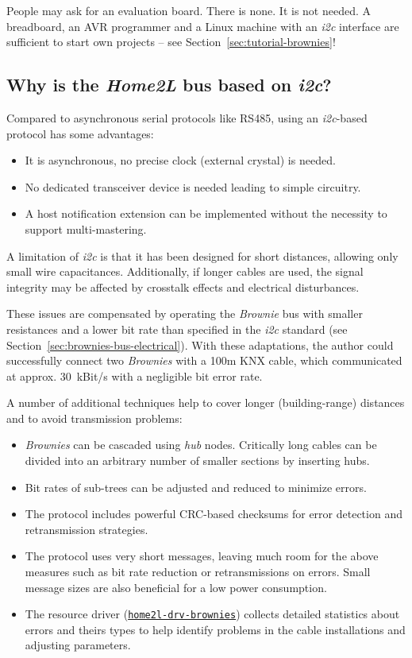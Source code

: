 \documentclass[12pt,english,parskip=half,headheight=19pt]{scrreprt}
\newcommand{\idx}[1]{#1\index{#1}}
\newcommand{\reftool}[1]{\hyperref[tool:#1]{\texttt{\idx{#1}}}}
\begin{document}
People may ask for an evaluation board. There is none. It is not needed. A breadboard, an AVR programmer and a Linux machine with an \textit{i2c} interface are sufficient to start own projects -- see Section~\ref{sec:tutorial-brownies}!



\subsection*{Why is the \textit{Home2L} bus based on \textit{i2c}?}

Compared to asynchronous serial protocols like RS485, using an \textit{i2c}-based protocol has some advantages:
\begin{itemize}
  \item It is asynchronous, no precise clock (external crystal) is needed.
  \item No dedicated transceiver device is needed leading to simple circuitry.
  \item A host notification extension can be implemented without the necessity to support
        multi-mastering.
\end{itemize}

A limitation of \textit{i2c} is that it has been designed for short distances, allowing only small wire capacitances. Additionally, if longer cables are used, the signal integrity may be affected by crosstalk effects and electrical disturbances.

These issues are compensated by operating the \textit{Brownie} bus with smaller resistances and a lower bit rate than specified in the \textit{i2c} standard (see Section~\ref{sec:brownies-bus-electrical}). With these adaptations, the author could successfully connect two \textit{Brownies} with a 100m KNX cable, which communicated at approx. 30~kBit/s with a negligible bit error rate.

A number of additional techniques help to cover longer (building-range) distances and to avoid transmission problems:
\begin{itemize}
  \item \textit{Brownies} can be cascaded using \textit{hub} nodes. Critically long cables can be divided into an arbitrary number of smaller sections by inserting hubs.
  \item Bit rates of sub-trees can be adjusted and reduced to minimize errors.
  \item The protocol includes powerful CRC-based checksums for error detection and retransmission strategies.
  \item The protocol uses very short messages, leaving much room for the above measures such as bit rate reduction or retransmissions on errors. Small message sizes are also beneficial for a low power consumption.
  \item The resource driver (\reftool{home2l-drv-brownies}) collects detailed statistics about errors and theirs types to help identify problems in the cable installations and adjusting parameters.
\end{itemize}
\end{document}
